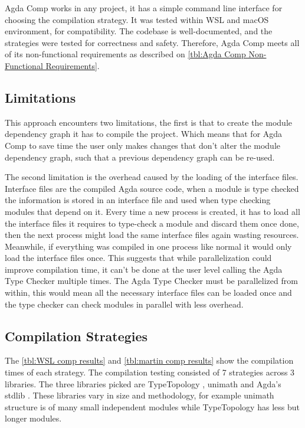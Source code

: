 Agda Comp works in any project, it has a simple command line interface for
choosing the compilation strategy. It was tested within WSL and macOS
environment, for compatibility. The codebase is well-documented, and the
strategies were tested for correctness and safety. Therefore, Agda Comp
meets all of its non-functional requirements as described on \cref{tbl:Agda
Comp Non-Functional Requirements}.

\subsection{Limitations} \label{sub:eval comp limitations}

This approach encounters two limitations, the first is that to create the
module dependency graph it has to compile the project. Which means that for
Agda Comp to save time the user only makes changes that don't alter the module
dependency graph, such that a previous dependency graph can be re-used.

The second limitation is the overhead caused by the loading of the interface
files. Interface files are the compiled Agda source code, when a module is type
checked the information is stored in an interface file and used when type checking
modules that depend on it. Every time a new process is created, it has to load
all the interface files it requires to type-check a module and discard them
once done, then the next process might load the same interface files again
wasting resources. Meanwhile, if everything was compiled in one process like
normal it would only load the interface files once. This suggests that while
parallelization could improve compilation time, it can't be done at the user
level calling the Agda Type Checker multiple times. The Agda Type Checker must
be parallelized from within, this would mean all the necessary interface files
can be loaded once and the type checker can check modules in parallel with less
overhead.

\subsection{Compilation Strategies} \label{sub:eval comp strat}

The \cref{tbl:WSL comp results} and \cref{tbl:martin comp results}
show the compilation times of each strategy. The compilation testing consisted
of 7 strategies across 3 libraries. The three libraries picked are TypeTopology
\cite{type-topology}, unimath \cite{agda-unimath} and Agda's stdlib
\cite{stdlib}. These libraries vary in size and methodology, for example
unimath structure is of many small independent modules while TypeTopology has
less but longer modules.

